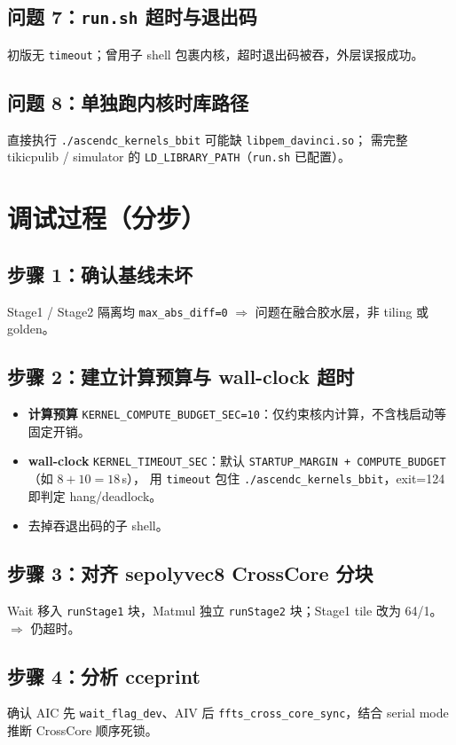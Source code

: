 \documentclass[UTF8,a4paper,11pt]{ctexart}
\begin{document}
\subsection{问题 7：\texttt{run.sh} 超时与退出码}
初版无 \texttt{timeout}；曾用子 shell 包裹内核，超时退出码被吞，外层误报成功。

\subsection{问题 8：单独跑内核时库路径}
直接执行 \texttt{./ascendc\_kernels\_bbit} 可能缺 \texttt{libpem\_davinci.so}；
需完整 tikicpulib / simulator 的 \texttt{LD\_LIBRARY\_PATH}（\texttt{run.sh} 已配置）。

\section{调试过程（分步）}

\subsection{步骤 1：确认基线未坏}
Stage1 / Stage2 隔离均 \texttt{max\_abs\_diff=0} $\Rightarrow$ 问题在融合胶水层，非 tiling 或 golden。

\subsection{步骤 2：建立计算预算与 wall-clock 超时}
\begin{itemize}
  \item \textbf{计算预算} \texttt{KERNEL\_COMPUTE\_BUDGET\_SEC=10}：仅约束核内计算，不含栈启动等固定开销。
  \item \textbf{wall-clock} \texttt{KERNEL\_TIMEOUT\_SEC}：默认 \texttt{STARTUP\_MARGIN + COMPUTE\_BUDGET}（如 $8+10=18$\,s），
        用 \texttt{timeout} 包住 \texttt{./ascendc\_kernels\_bbit}，exit=124 即判定 hang/deadlock。
  \item 去掉吞退出码的子 shell。
\end{itemize}

\subsection{步骤 3：对齐 sepolyvec8 CrossCore 分块}
Wait 移入 \texttt{runStage1} 块，Matmul 独立 \texttt{runStage2} 块；Stage1 tile 改为 64/1。
$\Rightarrow$ 仍超时。

\subsection{步骤 4：分析 cceprint}
确认 AIC 先 \texttt{wait\_flag\_dev}、AIV 后 \texttt{ffts\_cross\_core\_sync}，结合 serial mode 推断 CrossCore 顺序死锁。
\end{document}
